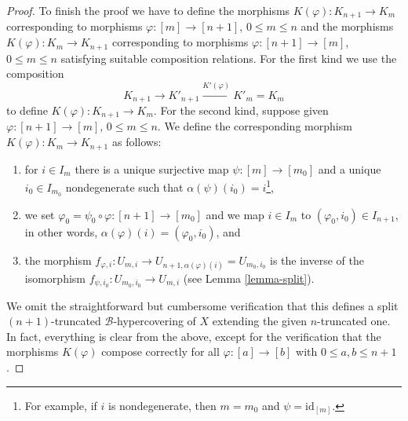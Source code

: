 \documentclass[10pt,a4paper]{amsart}
\theoremstyle{plain}
\theoremstyle{definition}
\theoremstyle{remark}
\numberwithin{equation}{subsection}
\begin{document}
\begin{proof}
\medskip\noindent
To finish the proof we have to define the morphisms
$K(\varphi) : K_{n + 1} \to K_m$ corresponding to morphisms
$\varphi : [m] \to [n + 1]$, $0 \leq m \leq n$ and the morphisms
$K(\varphi) : K_m \to K_{n + 1}$ corresponding to morphisms
$\varphi : [n + 1] \to [m]$, $0 \leq m \leq n$
satisfying suitable composition relations.
For the first kind we use the composition
$$
K_{n + 1} \to K'_{n + 1} \xrightarrow{K'(\varphi)} K'_m = K_m
$$
to define $K(\varphi) : K_{n + 1} \to K_m$.
For the second kind, suppose given $\varphi : [n + 1] \to [m]$,
$0 \leq m \leq n$. We define the corresponding morphism
$K(\varphi) : K_m \to K_{n + 1}$ as follows:
\begin{enumerate}
\item for $i \in I_m$ there is a unique surjective map
$\psi : [m] \to [m_0]$ and a unique $i_0 \in I_{m_0}$ nondegenerate
such that $\alpha(\psi)(i_0) = i$\footnote{For example, if $i$ is
nondegenerate, then $m = m_0$ and $\psi = \text{id}_{[m]}$.},
\item we set $\varphi_0 = \psi_0 \circ \varphi : [n + 1] \to [m_0]$
and we map
$i \in I_m$ to $(\varphi_0, i_0) \in I_{n + 1}$, in other words,
$\alpha(\varphi)(i) = (\varphi_0, i_0)$, and
\item the morphism
$f_{\varphi, i} : U_{m, i} \to U_{n + 1, \alpha(\varphi)(i)} = U_{m_0, i_0}$
is the inverse of the isomorphism $f_{\psi, i_0} : U_{m_0, i_0} \to U_{m, i}$
(see Lemma \ref{lemma-split}).
\end{enumerate}
We omit the straightforward but cumbersome verification that this defines
a split $(n + 1)$-truncated $\mathcal{B}$-hypercovering of $X$
extending the given $n$-truncated one. In fact, everything is clear
from the above, except for the verification that the morphisms
$K(\varphi)$ compose correctly for all $\varphi : [a] \to [b]$
with $0 \leq a, b \leq n + 1$.
\end{proof}
\end{document}
